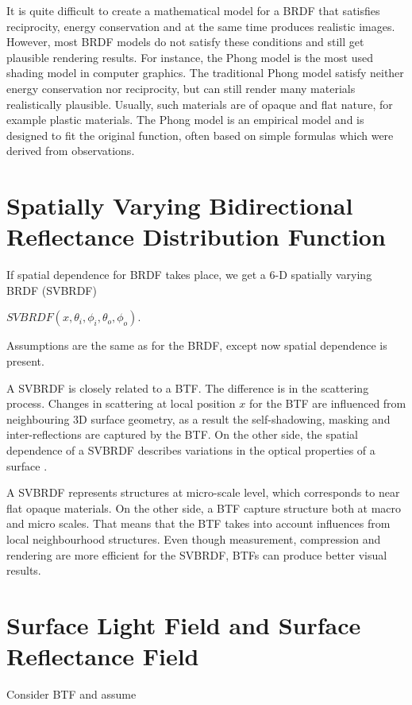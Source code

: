 It is quite difficult to create a mathematical model for a BRDF that satisfies reciprocity,
energy conservation and at the same time produces realistic images.
 However, most BRDF models do not satisfy these conditions and still get plausible rendering results.
For instance, the Phong model \cite{Phong} is the most used shading model in computer graphics. 
The traditional Phong model satisfy neither energy conservation nor reciprocity, but can still render many materials realistically plausible.
Usually, such materials are of opaque and flat nature, for example plastic materials.
The Phong model is an empirical model and is designed to fit the original function, often based on simple formulas which were derived from observations.


\section{Spatially Varying Bidirectional Reflectance Distribution Function}
\label{section:svbrdf}
If spatial dependence for BRDF takes place, we get a 6-D spatially varying BRDF (SVBRDF)


 \begin{center}
$SVBRDF(x,\theta_{i} ,\phi_{i},\theta_{o} ,\phi_{o})$.
 \end{center}
 Assumptions are the same as for the BRDF, except now spatial dependence is present.
 
A SVBRDF is closely related to a BTF. The difference is in the scattering process. 
Changes in scattering at local position $x$ for the BTF are influenced from neighbouring 3D surface geometry, as a result the self-shadowing, masking and inter-reflections are captured by the BTF.
On the other side, the spatial dependence of a SVBRDF describes variations in the optical properties of a surface \cite{haindl_visual}.


 
A SVBRDF represents structures at micro-scale level, which corresponds to near flat opaque materials. On the other side, a BTF capture structure both at macro and micro scales.
 That means that the BTF takes into account influences from local neighbourhood structures. Even though measurement, compression and rendering are more efficient for the SVBRDF, 
  BTFs can produce better visual results. \cite{haindl_visual}
 
 
\section{Surface Light Field and Surface Reflectance Field}
\label{section:slf}
Consider BTF and assume

